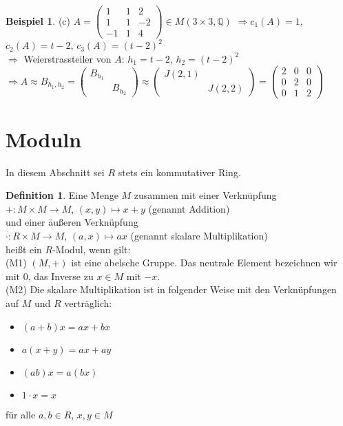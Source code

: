 \documentclass[10pt,a4paper,numbers=endperiod]{scrartcl}
\theoremstyle{definition}
\newtheorem{defi}[satz]{Definition}
\newtheorem{bsp}[satz]{Beispiel}
\def\QQ{{\mathbb Q}}
\begin{document}
\begin{bsp}
	(c) $A = \begin{pmatrix}
	1 & 1& 2\\
	1& 1 & -2\\
	-1 & 1 & 4
	\end{pmatrix} \in M(3 \times 3, \QQ)$ $\Rightarrow c_1(A) = 1$, $c_2(A) = t-2$, $c_3(A) = (t-2)^2$\\
	$\Rightarrow$ Weierstrassteiler von $A$: $h_1 = t-2$, $h_2 = (t-2)^2$\\
	$\Rightarrow A \approx B_{h_1, h_2} = \begin{pmatrix}
	B_{h_1}&\\
	& B_{h_2}
	\end{pmatrix} \approx \begin{pmatrix}
	J(2,1) &\\
	& J(2,2) 
	\end{pmatrix} = \begin{pmatrix}
	2 & 0 & 0\\
	0 & 2 & 0\\
	0 & 1 & 2
	\end{pmatrix}$	
\end{bsp}

\section{Moduln}

In diesem Abschnitt sei $R$ stets ein kommutativer Ring.\\

\begin{defi}
	Eine Menge $M$ zusammen mit einer Verknüpfung\\
	$+: M \times M \rightarrow M$, $(x,y) \mapsto x+y$ (genannt Addition)\\
	und einer äußeren Verknüpfung\\
	$\cdot: R \times M \rightarrow M$, $(a,x) \mapsto ax$ (genannt skalare Multiplikation)\\
	heißt ein $R$-Modul, wenn gilt:\\
	(M1) $(M,+)$ ist eine abelsche Gruppe. Das neutrale Element bezeichnen wir mit $0$, das Inverse zu $x \in M$ mit $-x$.\\
	(M2) Die skalare Multiplikation ist in folgender Weise mit den Verknüpfungen auf $M$ und $R$ verträglich:\\
	\begin{itemize}
		\item $(a+b)x = ax+bx$
		\item $a(x+y) = ax + ay$
		\item $(ab)x = a(bx)$
		\item $1 \cdot x = x$
	\end{itemize}
	für alle $a,b \in R$, $x, y \in M$
\end{defi}
\end{document}
